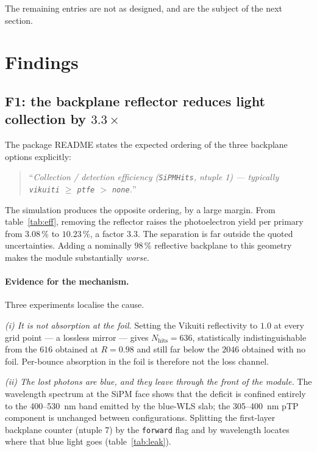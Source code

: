 \documentclass[a4paper,11pt]{article}
\begin{document}
The remaining entries are not as designed, and are the subject of the next
section.

\section{Findings}
\label{sec:findings}

\subsection{F1: the backplane reflector reduces light collection by \texorpdfstring{$3.3\times$}{3.3x}}
\label{sec:f1}

The package README states the expected ordering of the three backplane options
explicitly:

\begin{quote}
``\emph{Collection / detection efficiency (\texttt{SiPMHits}, ntuple 1) ---
typically \texttt{vikuiti} $\geq$ \texttt{ptfe} $>$ \texttt{none}.}''
\end{quote}

The simulation produces the opposite ordering, by a large margin. From
table~\ref{tab:eff}, removing the reflector raises the photoelectron yield per
primary from $3.08\,\%$ to $10.23\,\%$, a factor $3.3$. The separation is far
outside the quoted uncertainties. Adding a nominally $98\,\%$ reflective
backplane to this geometry makes the module substantially \emph{worse}.

\paragraph{Evidence for the mechanism.} Three experiments localise the cause.

\emph{(i) It is not absorption at the foil.} Setting the Vikuiti reflectivity to
$1.0$ at every grid point --- a lossless mirror --- gives $N_{\text{hits}}=636$,
statistically indistinguishable from the $616$ obtained at $R=0.98$ and still
far below the $2046$ obtained with no foil. Per-bounce absorption in the foil is
therefore not the loss channel.

\emph{(ii) The lost photons are blue, and they leave through the front of the
module.} The wavelength spectrum at the SiPM face shows that the deficit is
confined entirely to the \SI{400}{}--\SI{530}{\nano\meter} band emitted by the
blue-WLS slab; the \SI{305}{}--\SI{400}{\nano\meter} pTP component is unchanged
between configurations. Splitting the first-layer backplane counter (ntuple 7)
by the \texttt{forward} flag and by wavelength locates where that blue light
goes (table~\ref{tab:leak}).
\end{document}
